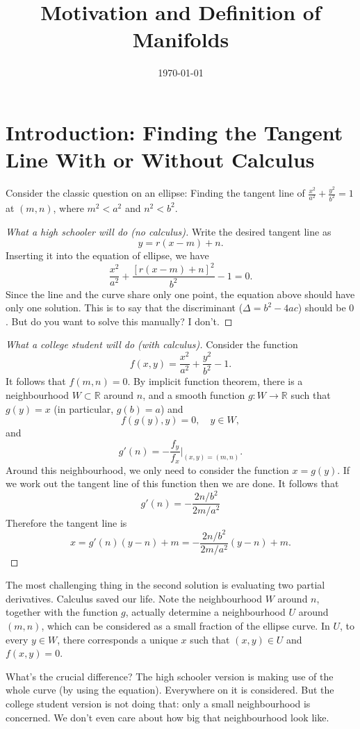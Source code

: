 \documentclass[twoside]{article}
\title{Motivation and Definition of Manifolds}
\date{\today}
\begin{document}
	\maketitle
	\section{Introduction: Finding the Tangent Line With or Without Calculus}
		Consider the classic question on an ellipse: Finding the tangent line of $\frac{x^2}{a^2}+\frac{y^2}{b^2}=1$ at $(m,n)$, where $m^2< a^2$ and $n^2 < b^2$. 
		\begin{proof}[What a high schooler will do (no calculus)]
			Write the desired tangent line as
			\[
				y=r(x-m)+n.
			\]
			Inserting it into the equation of ellipse, we have
			\[
				\frac{x^2}{a^2}+\frac{[r(x-m)+n]^2}{b^2}-1=0.
			\]
			Since the line and the curve share only one point, the equation above should have only one solution. This is to say that the discriminant ($\Delta = b^2-4ac$) should be $0$. But do you want to solve this manually? I don't. 
		\end{proof}
		\begin{proof}[What a college student will do (with calculus)]
			Consider the function
			\[
				f(x,y)=\frac{x^2}{a^2}+\frac{y^2}{b^2}-1.
			\]
			It follows that $f(m,n)=0$. By implicit function theorem, there is a neighbourhood $W \subset \mathbb{R}$ around $n$, and a smooth function $g:W \to \mathbb{R}$ such that $g(y)=x$ (in particular, $g(b)=a$) and
			\[
				f(g(y),y)=0, \quad y \in W,
			\]
			and 
			\[
				g'(n) = -\frac{f_y}{f_x}\vert_{(x,y)=(m,n)}.
			\]
			Around this neighbourhood, we only need to consider the function $x=g(y)$. If we work out the tangent line of this function then we are done. It follows that
			\[
				g'(n) = -\frac{2n/b^2}{2m/a^2}
			\]
			Therefore the tangent line is
			\[
				x=g'(n)(y-n)+m = -\frac{2n/b^2}{2m/a^2}(y-n)+m.
			\]
		\end{proof}
		The most challenging thing in the second solution is evaluating two partial derivatives. Calculus saved our life. Note the neighbourhood $W$ around $n$, together with the function $g$, actually determine a neighbourhood $U$ around $(m,n)$, which can be considered as a small fraction of the ellipse curve. In $U$, to every $y \in W$, there corresponds a unique $x$ such that $(x,y) \in U$ and $f(x,y)=0$.
		
		What's the crucial difference? The high schooler version is making use of the whole curve (by using the equation). Everywhere on it is considered. But the college student version is not doing that: only a small neighbourhood is concerned. We don't even care about how big that neighbourhood look like. 
		
\end{document}

